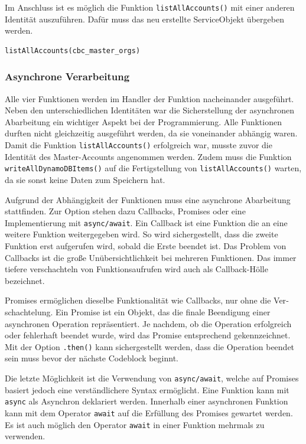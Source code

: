 Im Anschluss ist es möglich die Funktion \verb+listAllAccounts()+ mit einer anderen Identität auszuführen.
Dafür muss das neu erstellte ServiceObjekt übergeben werden.

\begin{lstlisting}[basicstyle=\ttfamily\small, breaklines=true , frame = single, backgroundcolor=\color{flashwhite} ]
listAllAccounts(cbc_master_orgs)
\end{lstlisting}
\clearpage
\subsubsection{Asynchrone Verarbeitung}
Alle vier Funktionen werden im Handler der Funktion nacheinander ausgeführt.
Neben den unterschiedlichen Identitäten war die Sicherstellung der asynchronen Abarbeitung ein wichtiger Aspekt bei der Programmierung.
Alle Funktionen durften nicht gleichzeitig ausgeführt werden, da sie voneinander abhängig waren.
Damit die Funktion \verb+listAllAccounts()+ erfolgreich war, musste zuvor die Identität des Master-Accounts angenommen werden.
Zudem muss die Funktion \verb+writeAllDynamoDBItems()+ auf die Fertigstellung von \verb+listAllAccounts()+ warten, da sie sonst keine Daten zum Speichern hat.

Aufgrund der Abhängigkeit der Funktionen muss eine asynchrone Abarbeitung stattfinden.
Zur Option stehen dazu Callbacks, Promises oder eine Implementierung mit \verb+async/await+.
Ein Callback ist eine Funktion die an eine weitere Funktion weitergegeben wird.
So wird sichergestellt, dass die zweite Funktion erst aufgerufen wird, sobald die Erste beendet ist.
Das Problem von Callbacks ist die große Unübersichtlichkeit bei mehreren Funktionen.
Das immer tiefere verschachteln von Funktionsaufrufen wird auch als \glqq Callback-Hölle\grqq{} bezeichnet.

Promises ermöglichen dieselbe Funktionalität wie Callbacks, nur ohne die Ver­schach­telung.
\glqq Ein Promise ist ein Objekt, das die finale Beendigung einer asynchronen Operation repräsentiert.
Je nachdem, ob die Operation erfolgreich oder fehlerhaft beendet wurde, wird das Promise entsprechend gekennzeichnet. \grqq{} \cite{Promises}
Mit der Option \verb+.then()+ kann sichergestellt werden, dass die Operation beendet sein muss bevor der nächste Codeblock beginnt.

Die letzte Möglichkeit ist die Verwendung von \verb+async/await+, welche auf Promises basiert jedoch eine verständlichere Syntax ermöglicht.
Eine Funktion kann mit \verb+async+ als Asynchron deklariert werden.
Innerhalb einer asynchronen Funktion kann mit dem Operator \verb+await+ auf die Erfüllung des Promises gewartet werden.
Es ist auch möglich den Operator \verb+await+ in einer Funktion mehrmals zu verwenden.

